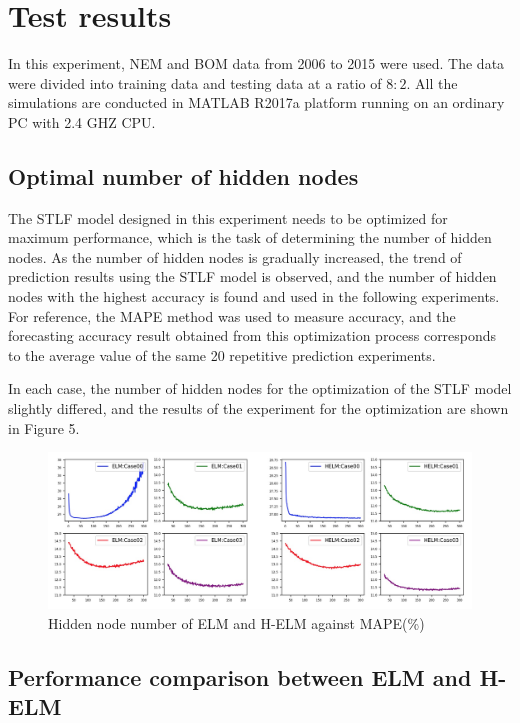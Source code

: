 \documentclass[runningheads,a4paper]{llncs}
\begin{document}
\section{Test results}

In this experiment, NEM and BOM data from 2006 to 2015 were used. The data were divided into training data and testing data at a ratio of $8:2$. All the simulations are conducted in MATLAB R2017a platform running on an ordinary PC with 2.4 GHZ CPU. 

\subsection{Optimal number of hidden nodes}

The STLF model designed in this experiment needs to be optimized for maximum performance, which is the task of determining the number of hidden nodes. As the number of hidden nodes is gradually increased, the trend of prediction results using the STLF model is observed, and the number of hidden nodes with the highest accuracy is found and used in the following experiments. For reference, the MAPE method was used to measure accuracy, and the forecasting accuracy result obtained from this optimization process corresponds to the average value of the same 20 repetitive prediction experiments. 

In each case, the number of hidden nodes for the optimization of the STLF model slightly differed, and the results of the experiment for the optimization are shown in Figure 5.

\begin{figure}
\centering
\includegraphics[width=12.3cm]{optimal_figure}
\caption{Hidden node number of ELM and H-ELM against MAPE(\%)}
\label{fig:helm_figure}
\end{figure}

\subsection{Performance comparison between ELM and H-ELM}
\end{document}

